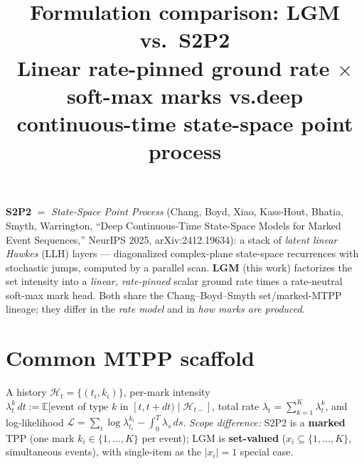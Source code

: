 \documentclass[11pt]{article}
\title{\textbf{Formulation comparison: LGM vs.\ S2P2}\\[2pt]
\large Linear rate-pinned ground rate $\times$ soft-max marks \quad vs.\quad deep continuous-time state-space point process}
\author{}\date{}
\begin{document}
\maketitle
\vspace{-3em}

\noindent\textbf{S2P2} $=$ \emph{State-Space Point Process} (Chang, Boyd, Xiao, Kass-Hout, Bhatia,
Smyth, Warrington, ``Deep Continuous-Time State-Space Models for Marked Event Sequences,''
NeurIPS 2025, arXiv:2412.19634): a stack of \emph{latent linear Hawkes} (LLH) layers --- diagonalized
complex-plane state-space recurrences with stochastic jumps, computed by a parallel scan.
\textbf{LGM} (this work) factorizes the set intensity into a \emph{linear, rate-pinned} scalar
ground rate times a rate-neutral soft-max mark head. Both share the Chang--Boyd--Smyth set/marked-MTPP
lineage; they differ in the \emph{rate model} and in \emph{how marks are produced}.

\section{Common MTPP scaffold}
A history $\mathcal{H}_t=\{(t_i,k_i)\}$, per-mark intensity
$\lambda^k_t\,dt:=\mathbb{E}[\text{event of type }k\text{ in }[t,t{+}dt)\mid\mathcal{H}_{t-}]$, total rate
$\lambda_t=\sum_{k=1}^K\lambda^k_t$, and log-likelihood
$\mathcal{L}=\sum_i\log\lambda^{k_i}_{t_i}-\int_0^T\lambda_s\,ds$.
\emph{Scope difference:} S2P2 is a \textbf{marked} TPP (one mark $k_i\in\{1,\dots,K\}$ per event);
LGM is \textbf{set-valued} ($x_i\subseteq\{1,\dots,K\}$, simultaneous events), with single-item as the
$|x_i|=1$ special case.
\end{document}
